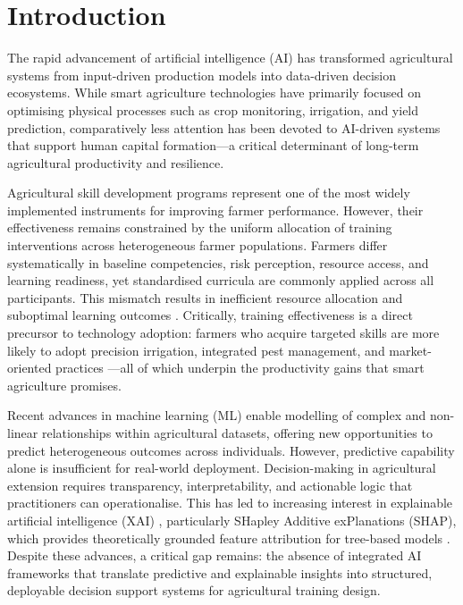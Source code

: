 \documentclass[3p,twocolumn,authoryear]{elsarticle}
\begin{document}

\section{Introduction}

The rapid advancement of artificial intelligence (AI) has transformed
agricultural systems from input-driven production models into
data-driven decision ecosystems.
While smart agriculture technologies have primarily focused on
optimising physical processes such as crop monitoring, irrigation,
and yield prediction, comparatively less attention has been devoted
to AI-driven systems that support human capital
formation---a critical determinant of long-term agricultural
productivity and resilience.

Agricultural skill development programs represent one of the most
widely implemented instruments for improving farmer performance.
However, their effectiveness remains constrained by the uniform
allocation of training interventions across heterogeneous farmer
populations.
Farmers differ systematically in baseline competencies, risk
perception, resource access, and learning readiness, yet
standardised curricula are commonly applied across all participants.
This mismatch results in inefficient resource allocation and
suboptimal learning outcomes \citep{anderson2004,feder1985}.
Critically, training effectiveness is a direct precursor to
technology adoption: farmers who acquire targeted skills are more
likely to adopt precision irrigation, integrated pest management,
and market-oriented practices \citep{davis2012}---all of which
underpin the productivity gains that smart agriculture promises.

Recent advances in machine learning (ML) \citep{kamilaris2018,
liakos2018,yang2025} enable modelling of complex and non-linear
relationships within agricultural datasets, offering new
opportunities to predict heterogeneous outcomes across individuals.
However, predictive capability alone is insufficient for real-world
deployment.
Decision-making in agricultural extension requires transparency,
interpretability, and actionable logic that practitioners can
operationalise.
This has led to increasing interest in explainable artificial
intelligence (XAI) \citep{arrieta2020,ryo2022}, particularly
SHapley Additive exPlanations (SHAP), which provides
theoretically grounded feature attribution for tree-based models
\citep{lundberg2017}.
Despite these advances, a critical gap remains: the absence of
integrated AI frameworks that translate predictive and explainable
insights into structured, deployable decision support systems for
agricultural training design.
\end{document}
